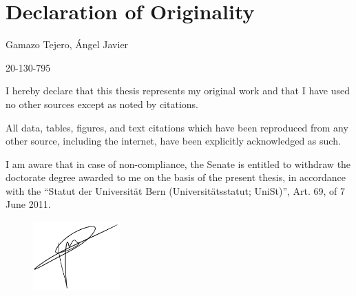 \chapter*{Declaration of Originality}

{\setlength{\parskip}{10pt}
 Gamazo Tejero, Ángel Javier

 20-130-795
}

\vspace{1cm}

{\setlength{\parskip}{10pt}
\noindent I hereby declare that this thesis represents my original work and that I have used no other sources except as noted by citations.

\noindent All data, tables, figures, and text citations which have been reproduced from any other source, including the internet, have been explicitly acknowledged as such.

\noindent I am aware that in case of non-compliance, the Senate is entitled to withdraw the doctorate degree awarded to me on the basis of the present thesis, in accordance with the “Statut der Universität Bern (Universitätsstatut; UniSt)”, Art. 69, of 7 June 2011.
}
\vspace{1cm}

 \vspace{1cm}
\begin{figure}[h]
\hspace{2cm}
\vspace{-1cm}
    \includegraphics[width=0.3\textwidth]{backmatter/signature.png}
\end{figure}
 
